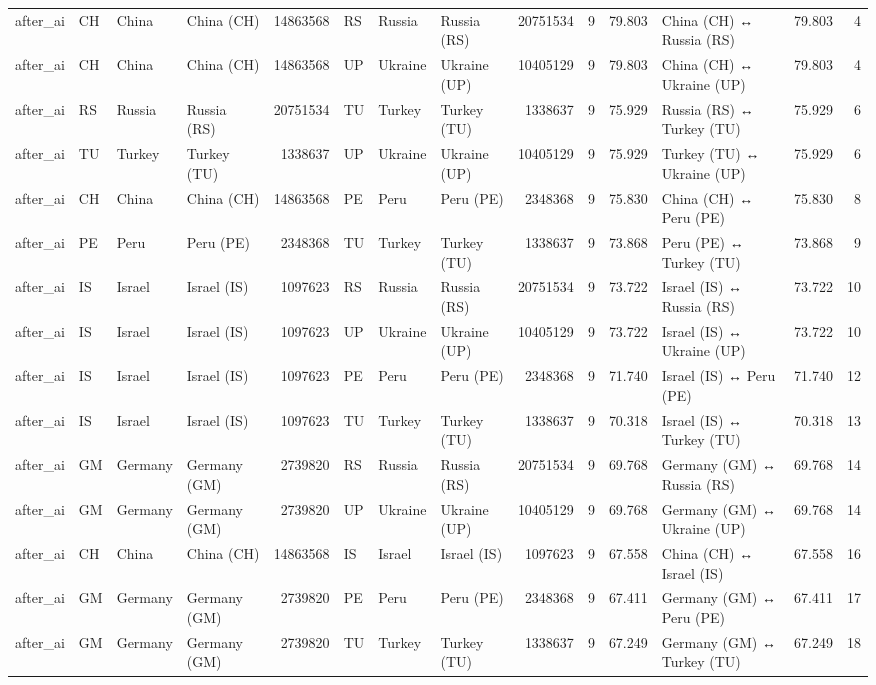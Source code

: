 \begin{tabular}{llllrlllrrrlrr}
after\_ai & CH & China & China (CH) & 14863568 & RS & Russia & Russia (RS) & 20751534 & 9 & 79.803 & China (CH) ↔ Russia (RS) & 79.803 & 4 \\
after\_ai & CH & China & China (CH) & 14863568 & UP & Ukraine & Ukraine (UP) & 10405129 & 9 & 79.803 & China (CH) ↔ Ukraine (UP) & 79.803 & 4 \\
after\_ai & RS & Russia & Russia (RS) & 20751534 & TU & Turkey & Turkey (TU) & 1338637 & 9 & 75.929 & Russia (RS) ↔ Turkey (TU) & 75.929 & 6 \\
after\_ai & TU & Turkey & Turkey (TU) & 1338637 & UP & Ukraine & Ukraine (UP) & 10405129 & 9 & 75.929 & Turkey (TU) ↔ Ukraine (UP) & 75.929 & 6 \\
after\_ai & CH & China & China (CH) & 14863568 & PE & Peru & Peru (PE) & 2348368 & 9 & 75.830 & China (CH) ↔ Peru (PE) & 75.830 & 8 \\
after\_ai & PE & Peru & Peru (PE) & 2348368 & TU & Turkey & Turkey (TU) & 1338637 & 9 & 73.868 & Peru (PE) ↔ Turkey (TU) & 73.868 & 9 \\
after\_ai & IS & Israel & Israel (IS) & 1097623 & RS & Russia & Russia (RS) & 20751534 & 9 & 73.722 & Israel (IS) ↔ Russia (RS) & 73.722 & 10 \\
after\_ai & IS & Israel & Israel (IS) & 1097623 & UP & Ukraine & Ukraine (UP) & 10405129 & 9 & 73.722 & Israel (IS) ↔ Ukraine (UP) & 73.722 & 10 \\
after\_ai & IS & Israel & Israel (IS) & 1097623 & PE & Peru & Peru (PE) & 2348368 & 9 & 71.740 & Israel (IS) ↔ Peru (PE) & 71.740 & 12 \\
after\_ai & IS & Israel & Israel (IS) & 1097623 & TU & Turkey & Turkey (TU) & 1338637 & 9 & 70.318 & Israel (IS) ↔ Turkey (TU) & 70.318 & 13 \\
after\_ai & GM & Germany & Germany (GM) & 2739820 & RS & Russia & Russia (RS) & 20751534 & 9 & 69.768 & Germany (GM) ↔ Russia (RS) & 69.768 & 14 \\
after\_ai & GM & Germany & Germany (GM) & 2739820 & UP & Ukraine & Ukraine (UP) & 10405129 & 9 & 69.768 & Germany (GM) ↔ Ukraine (UP) & 69.768 & 14 \\
after\_ai & CH & China & China (CH) & 14863568 & IS & Israel & Israel (IS) & 1097623 & 9 & 67.558 & China (CH) ↔ Israel (IS) & 67.558 & 16 \\
after\_ai & GM & Germany & Germany (GM) & 2739820 & PE & Peru & Peru (PE) & 2348368 & 9 & 67.411 & Germany (GM) ↔ Peru (PE) & 67.411 & 17 \\
after\_ai & GM & Germany & Germany (GM) & 2739820 & TU & Turkey & Turkey (TU) & 1338637 & 9 & 67.249 & Germany (GM) ↔ Turkey (TU) & 67.249 & 18 \\

\end{tabular}

